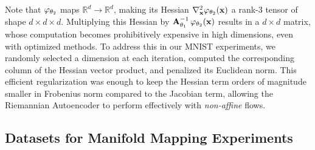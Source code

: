 
Note that \(\varphi_{\theta_2}\) maps \(\mathbb{R}^d \to \mathbb{R}^d\), making its Hessian \(\nabla_{\mathbf{x}}^2 \varphi_{\theta_2}(\mathbf{x})\) a rank-3 tensor of shape \(d \times d \times d\). Multiplying this Hessian by \(\mathbf{A}_{\theta_1}^{-1}\,\varphi_{\theta_2}(\mathbf{x})\) results in a \(d \times d\) matrix, whose computation becomes prohibitively expensive in high dimensions, even with optimized methods. To address this in our MNIST experiments, we randomly selected a dimension at each iteration, computed the corresponding column of the Hessian vector product, and penalized its Euclidean norm. This efficient regularization was enough to keep the Hessian term orders of magnitude smaller in Frobenius norm compared to the Jacobian term, allowing the Riemannian Autoencoder to perform effectively with \textit{non-affine} flows.

\subsection{Datasets for Manifold Mapping Experiments}
\label{app:manifold_mapping}

